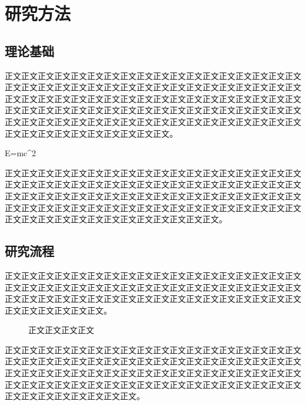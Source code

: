 \chapter{研究方法}\label{chap:methods}
\section{理论基础}
正文正文正文正文正文正文正文正文正文正文正文正文正文正文正文正文正文正文正文正文正文正文正文正文正文正文正文正文正文正文正文正文正文正文正文正文正文正文正文正文正文正文正文正文正文正文正文正文正文正文正文正文正文正文正文正文正文正文正文正文正文正文正文正文正文正文正文正文正文正文正文正文正文正文正文正文正文正文正文正文正文正文正文正文正文正文正文正文正文正文正文正文正文正文正文正文正文正文正文正文。

\begin{uscequation}\label{eq:energy}
  E=mc^{2}
\end{uscequation}
正文正文正文正文正文正文正文正文正文正文正文正文正文正文正文正文正文正文正文正文正文正文正文正文正文正文正文正文正文正文正文正文正文正文正文正文正文正文正文正文正文正文正文正文正文正文正文正文正文正文正文正文正文正文正文正文正文正文正文正文正文正文正文正文正文正文正文正文正文正文正文正文正文正文正文正文正文正文正文正文正文正文正文正文正文。

\section{研究流程}
正文正文正文正文正文正文正文正文正文正文正文正文正文正文正文正文正文正文正文正文正文正文正文正文正文正文正文正文正文正文正文正文正文正文正文正文正文正文正文正文正文正文正文正文正文正文正文正文正文正文正文正文正文正文正文正文正文正文正文正文。

\begin{figure}[htbp]
  \centering
  \caption{正文正文正文正文}\label{fig:workflow}
\end{figure}
正文正文正文正文正文正文正文正文正文正文正文正文正文正文正文正文正文正文正文正文正文正文正文正文正文正文正文正文正文正文正文正文正文正文正文正文正文正文正文正文正文正文正文正文正文正文正文正文正文正文正文正文正文正文正文正文正文正文正文正文正文正文正文正文正文正文正文正文正文正文正文正文正文正文正文正文正文正文正文正文。

